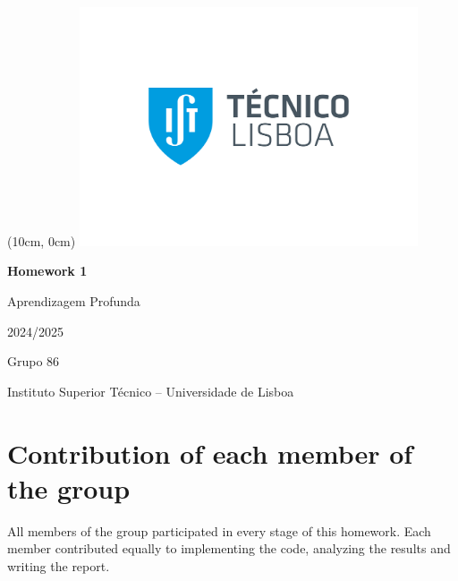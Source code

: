 \documentclass[12pt,a4paper]{article}
\newcommand{\reporttitle}{Homework 1}
\newcommand{\authorgroup}{Grupo 86}
\newcommand{\istul}{Instituto Superior Técnico -- Universidade de Lisboa}
\newcommand{\reportcourse}{Aprendizagem Profunda}
\newcommand{\reportyear}{2024/2025}
\begin{document}
    \begin{titlepage}

        \begin{textblock*}{0cm}(10cm, 0cm)
            \includegraphics[width=10cm]{Logo IST.jpg}
        \end{textblock*}

        \centering
        \vspace*{5cm}
        {\Huge \textbf{\reporttitle} \par}

        \vspace{0.5cm}
        {\LARGE \reportcourse \par}

        \vspace{0.5cm}
        {\large \reportyear \par}

        \vspace{2cm}
        {\large \authorgroup \par}
        
        \vspace{0.25cm}
        {\large \istul \par}

        \vfill
        \renewcommand{\contentsname}{Índice}
        \tableofcontents

        \thispagestyle{empty}
        \clearpage

    \end{titlepage}

    \section*{Contribution of each member of the group}
    All members of the group participated in every stage of this homework. Each member contributed equally to implementing the code, analyzing the results and writing the report.
\end{document}
